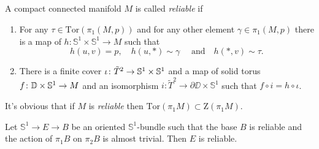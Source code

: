 \documentclass{amsart}
\begin{document}
\subsection{}


\begin{defn}
A compact connected manifold $M$ is called \emph{reliable} if 
\begin{enumerate}
\item \label{reliable1} For any 
$\tau\in \mathrm{Tor}(\pi_1(M,p))$ and for any other element $\gamma\in \pi_1(M,p)$ there is a map of $h\colon \mathbb{S}^1\times \mathbb{S}^1\to M$  such that 
$$h(u,v)= p,\quad
h(u,*)\sim\gamma\quad\text{ and}\quad
h(*,v)\sim\tau.$$
\item \label{reliable2} There is a finite cover $\iota\colon \tilde T^2\z\to \mathbb{S}^1\times \mathbb{S}^1$ and a map of solid torus $f\colon \DD\times \mathbb{S}^1\z\to M$ and an isomorphism $i\colon \tilde T^2\to \partial \DD\times \mathbb{S}^1$ such that $f\circ i=h\circ\iota$.
\end{enumerate}

\end{defn}

It's obvious that if $M$ is \emph{reliable} then  $\mathrm{Tor}(\pi_1M)\subset \mathrm{Z}(\pi_1M)$.
\begin{claim}
 Let $\mathbb{S}^1\to E\to B$ be an oriented $\mathbb{S}^1$-bundle such that the base  $B$ is reliable and the action of $\pi_1B$ on $\pi_2B$ is almost trivial. 
Then $E$ is reliable.
\end{claim}
\end{document}
